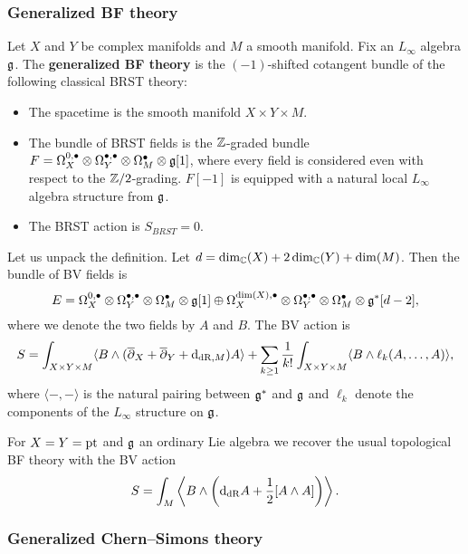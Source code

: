 \documentclass[10pt, oneside]{article}
\begin{document}
\subsubsection{Generalized BF theory} \label{gen_BF_section}

\begin{definition}
Let $X$ and $Y$ be complex manifolds and $M$ a smooth manifold. Fix an $L_\infty$ algebra $\mathfrak g$. The {\bf generalized BF theory} is the $(-1)$-shifted cotangent bundle of the following classical BRST theory:
\begin{itemize}
\item The spacetime is the smooth manifold $X\times Y\times M$.

\item The bundle of BRST fields is the $\mathbb Z$-graded bundle $F = \Omega^{0,\bullet}_X \otimes \Omega^{\bullet,\bullet}_Y \otimes \Omega^\bullet_M \otimes \mathfrak g[1]$, where every field is considered even with respect to the $\mathbb Z/2$-grading. $F[-1]$ is equipped with a natural local $L_\infty$ algebra structure from $\mathfrak g$.

\item The BRST action is $S_{BRST} = 0$.
\end{itemize}
\end{definition}

Let us unpack the definition. Let $d = \dim_\mathbb C(X) + 2\dim_\mathbb C(Y) + \dim(M)$. Then the bundle of BV fields is
\[E = \Omega^{0,\bullet}_X \otimes \Omega^{\bullet,\bullet}_Y \otimes \Omega^\bullet_M \otimes \mathfrak g[1]\oplus \Omega^{\dim(X),\bullet}_X \otimes \Omega^{\bullet,\bullet}_Y \otimes \Omega^\bullet_M\otimes \mathfrak g^*[d-2],\]
where we denote the two fields by $A$ and $B$. The BV action is
\[S = \int_{X\times Y\times M} \langle B\wedge (\overline{\partial}_X + \overline{\partial}_Y + {\rm d}_{\mathrm{dR}, M}) A\rangle + \sum_{k\geq 1}\frac{1}{k!} \int_{X\times Y\times M} \langle B\wedge \ell_k(A, \dots, A)\rangle,\]
where $\langle -, -\rangle$ is the natural pairing between $\mathfrak g^*$ and $\mathfrak g$ and $\ell_k$ denote the components of the $L_\infty$ structure on $\mathfrak g$.

\begin{example}
For $X=Y=\operatorname{pt}$ and $\mathfrak g$ an ordinary Lie algebra we recover the usual topological BF theory with the BV action
\[S = \int_M \left\langle B\wedge \left({\rm d}_{\mathrm{dR}} A+ \frac{1}{2}[A\wedge A]\right)\right\rangle.\]
\end{example}

\subsubsection{Generalized Chern--Simons theory} \label{gen_CS_section}
\end{document}

